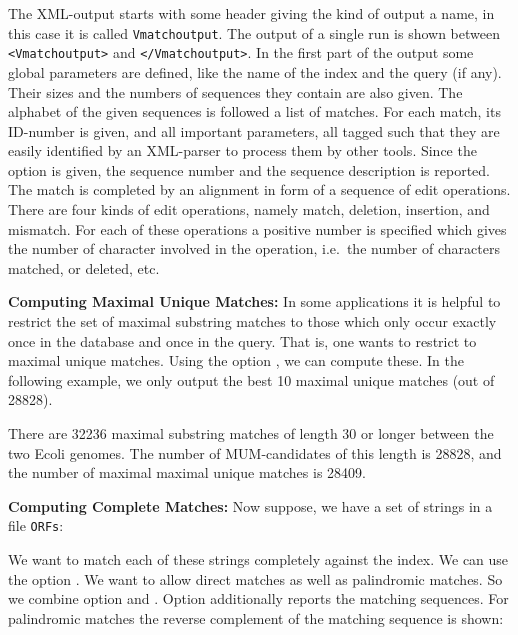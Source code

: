 \documentclass[12pt,titlepage]{article}
\makeatletter
\newcommand{\Seqfilename}[1]{\texttt{\small #1}\index{#1@\texttt{#1}}}
\newcommand{\EXECUTE}[1]{}
\makeatother
\begin{document}
\begin{AboutVmatch}
\EXECUTE{vmatch -l 250 -e 6 -q U89959 -s xml -showdesc 0 atEST | grep -v Vmatchalphabetsymbolmap}

The XML-output starts with some header giving the kind of output a
name, in this case it is called \texttt{Vmatchoutput}.
The output of a single \VM run is shown between 
\texttt{<Vmatchoutput>} and \texttt{</Vmatchoutput>}. In the first
part of the output some global parameters are defined, like
the name of the index and the query (if any). Their sizes and the
numbers of sequences they contain are also given. The alphabet of the
given sequences is followed a list of matches. For each match,
its ID-number is given, and all important parameters, all 
tagged such that they are easily identified by an XML-parser to
process them by other tools. Since the option  is
given, the sequence number and the sequence description is
reported. The match is completed by an alignment in form of a 
sequence of edit operations. There are four kinds of edit operations, namely
match, deletion, insertion, and mismatch. For each of these
operations a positive number is specified which gives the number
of character involved in the operation, i.e.\ the number of
characters matched, or deleted, etc.

\textbf{Computing Maximal Unique Matches:}
In some applications it is helpful to restrict the set of maximal
substring matches to those which only occur exactly once in the 
database and once in the query. That is, one wants to restrict to
maximal unique matches. Using the option , we can compute 
these. In the following example, we only output the best 10 maximal
unique matches (out of 28828).

\EXECUTE{vmatch -mum -l 30 -q EcoliK12 -best 10 EcoliO157H7}

There are 32236 maximal substring matches of length 30 or longer
between the two Ecoli genomes. The number of MUM-candidates of this length
is 28828, and the number of maximal maximal unique matches is 28409.

\textbf{Computing Complete Matches:}
Now suppose, we have a set of strings in a file \Seqfilename{ORFs}: 

\EXECUTE{cat ORFs}

We want to match each of these strings completely against the index. 
We can use the option . We want to allow direct 
matches as well as palindromic matches. So we combine option 
 and . Option  additionally 
reports the matching sequences. For palindromic matches the reverse complement 
of the matching sequence is shown:


\end{AboutVmatch}
\end{document}
